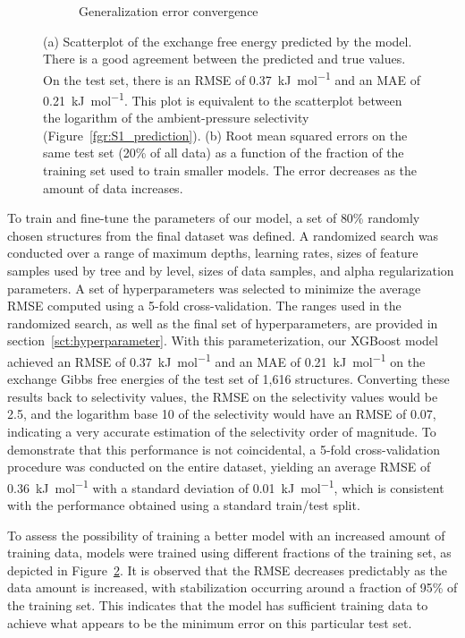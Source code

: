 \documentclass[main]{subfiles}
\begin{document}
\begin{figure}[ht]
\begin{subfigure}[b]{0.48\textwidth}
    \caption{Generalization error convergence}\label{fgr:training_curve}
  \end{subfigure}
  \caption{ (a) Scatterplot of the exchange free energy predicted by the model. There is a good agreement between the predicted and true values. On the test set, there is an RMSE of \SI{0.37}{\kilo\joule\per\mole} and an MAE of \SI{0.21}{\kilo\joule\per\mole}. This plot is equivalent to the scatterplot between the logarithm of the ambient-pressure selectivity (Figure~\ref{fgr:S1_prediction}). (b) Root mean squared errors on the same test set (20\% of all data) as a function of the fraction of the training set used to train smaller models. The error decreases as the amount of data increases.}
\end{figure}


To train and fine-tune the parameters of our model, a set of {80\%} randomly chosen structures from the final dataset was defined. A randomized search was conducted over a range of maximum depths, learning rates, sizes of feature samples used by tree and by level, sizes of data samples, and alpha regularization parameters. A set of hyperparameters was selected to minimize the average RMSE computed using a 5-fold cross-validation. The ranges used in the randomized search, as well as the final set of hyperparameters, are provided in section~\ref{sct:hyperparameter}. With this parameterization, our XGBoost model achieved an RMSE of \SI{0.37}{\kilo\joule\per\mole} and an MAE of \SI{0.21}{\kilo\joule\per\mole} on the exchange Gibbs free energies of the test set of 1,616 structures. Converting these results back to selectivity values, the RMSE on the selectivity values would be 2.5, and the logarithm base 10 of the selectivity would have an RMSE of 0.07, indicating a very accurate estimation of the selectivity order of magnitude. To demonstrate that this performance is not coincidental, a 5-fold cross-validation procedure was conducted on the entire dataset, yielding an average RMSE of \SI{0.36}{\kilo\joule\per\mole} with a standard deviation of \SI{0.01}{\kilo\joule\per\mole}, which is consistent with the performance obtained using a standard train/test split.

To assess the possibility of training a better model with an increased amount of training data, models were trained using different fractions of the training set, as depicted in Figure~\ref{fgr:training_curve}. It is observed that the RMSE decreases predictably as the data amount is increased, with stabilization occurring around a fraction of 95\% of the training set. This indicates that the model has sufficient training data to achieve what appears to be the minimum error on this particular test set.
\end{document}
